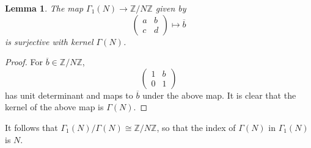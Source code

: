 \documentclass[10pt,leqno]{article}
\theoremstyle{plain}
\newtheorem{lemma}[lem]{Lemma}
\theoremstyle{definition}
\numberwithin{equation}{section}
\numberwithin{lem}{section}
\newcommand{\smod}[1]{\;(\bmod\; #1)}
\newcommand{\abcd}{\begin{pmatrix}
    a & b \\ c & d
\end{pmatrix}}
\begin{document}
\begin{lemma}
    The map $\varGamma_1(N)\to \mathbb{Z}/N\mathbb{Z}$ given by \[\abcd\mapsto \overline b\] is surjective with kernel $\varGamma(N)$. 
\end{lemma}
\begin{proof}
    For $\overline b\in\mathbb{Z}/N\mathbb{Z}$, \[\begin{pmatrix}
        1 & b \\ 0 & 1
    \end{pmatrix}\] has unit determinant and maps to $\overline b$ under the above map. It is clear that the kernel of the above map is $\varGamma(N)$.
\end{proof} 
It follows that $\varGamma_1(N)/\varGamma(N)\cong \mathbb{Z}/N\mathbb{Z}$, so that the index of $\varGamma(N)$ in $\varGamma_1(N)$ is $N$.
\end{document}
